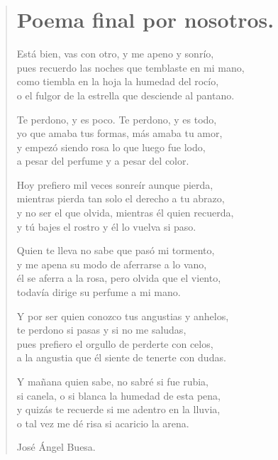 \documentclass[11pt, portrait, twoside, notitlepage, openright]{book}
\begin{document}
\newpage
\begin{verse}
\begin{center}
\section{Poema final por nosotros.}
\end{center}
Está bien, vas con otro, y me apeno y sonrío,\\
pues recuerdo las noches que temblaste en mi mano,\\
como tiembla en la hoja la humedad del rocío,\\
o el fulgor de la estrella que desciende al pantano.
\newline

Te perdono, y es poco. Te perdono, y es todo,\\
yo que amaba tus formas, más amaba tu amor,\\
y empezó siendo rosa lo que luego fue lodo,\\
a pesar del perfume y a pesar del color.
\newline

Hoy prefiero mil veces sonreír aunque pierda,\\
mientras pierda tan solo el derecho a tu abrazo,\\
y no ser el que olvida, mientras él quien recuerda,\\
y tú bajes el rostro y él lo vuelva si paso.
\newline

Quien te lleva no sabe que pasó mi tormento,\\
y me apena su modo de aferrarse a lo vano,\\
él se aferra a la rosa, pero olvida que el viento,\\
todavía dirige su perfume a mi mano.
\newline

Y por ser quien conozco tus angustias y anhelos,\\
te perdono si pasas y si no me saludas,\\
pues prefiero el orgullo de perderte con celos,\\
a la angustia que él siente de tenerte con dudas.
\newpage

Y mañana quien sabe, no sabré si fue rubia,\\
si canela, o si blanca la humedad de esta pena,\\
y quizás te recuerde si me adentro en la lluvia,\\
o tal vez me dé risa si acaricio la arena.
\newline

José Ángel Buesa.
\end{verse}
\end{document}
